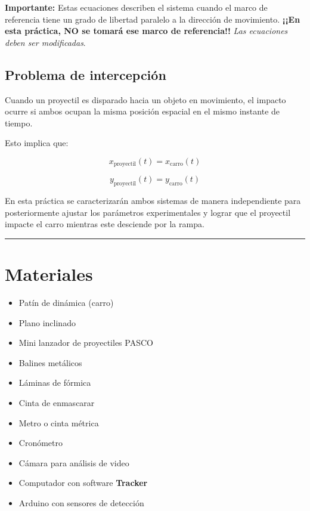 \textbf{Importante:} Estas ecuaciones describen el sistema cuando el marco de referencia tiene un grado de libertad paralelo a la dirección de movimiento. \textbf{¡¡En esta práctica, NO se tomará ese marco de referencia!!} \textit{Las ecuaciones deben ser modificadas}.

\subsection*{Problema de intercepción}

Cuando un proyectil es disparado hacia un objeto en movimiento, el impacto ocurre si ambos ocupan la misma posición espacial en el mismo instante de tiempo.

Esto implica que:

\begin{equation}
x_{\text{proyectil}}(t) = x_{\text{carro}}(t)
\end{equation}

\begin{equation}
y_{\text{proyectil}}(t) = y_{\text{carro}}(t)
\end{equation}

En esta práctica se caracterizarán ambos sistemas de manera independiente para posteriormente ajustar los parámetros experimentales y lograr que el proyectil impacte el carro mientras este desciende por la rampa.

\rule{\textwidth}{1pt}

\section*{Materiales}

\begin{itemize}
\item Patín de dinámica (carro)
\item Plano inclinado
\item Mini lanzador de proyectiles PASCO
\item Balines metálicos
\item Láminas de fórmica
\item Cinta de enmascarar
\item Metro o cinta métrica
\item Cronómetro
\item Cámara para análisis de video
\item Computador con software \textbf{Tracker}
\item Arduino con sensores de detección
\end{itemize}

